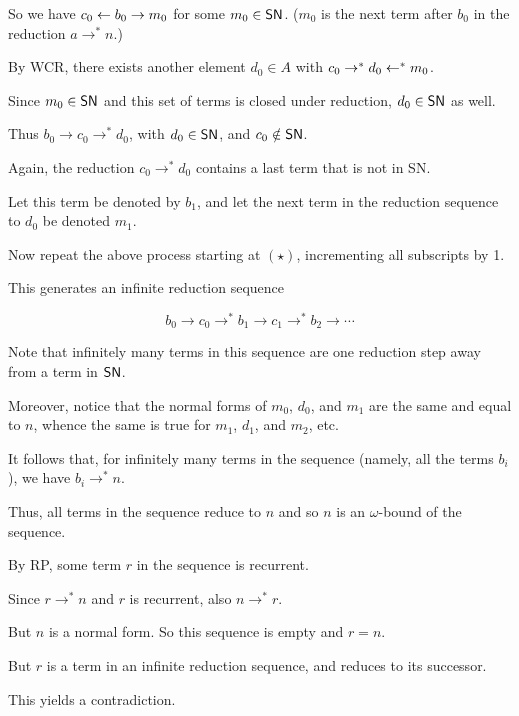 \documentclass{scrartcl}
\begin{document}
\begin{itemize}
  So we have $c_0 \leftarrow b_0 \to m_0$ for some $m_0 \in \mathsf{SN}$. ($m_0$ is the next term after $b_0$ in the reduction $a \to^* n$.)

  By WCR, there exists another element $d_0 \in A$ with $c_0 \to^* d_0 \leftarrow^* m_0$.

  Since $m_0 \in \mathsf{SN}$ and this set of terms is closed under reduction, $d_0 \in \mathsf{SN}$ as well.

  Thus $b_0 \to c_0 \to^* d_0$, with $d_0 \in \mathsf{SN}$, and $c_0 \notin \mathsf{SN}$.

  Again, the reduction $c_0 \to^* d_0$ contains a last term that is not in SN.

  Let this term be denoted by $b_1$, and let the next term in the reduction sequence
  to $d_0$ be denoted $m_1$.

  Now repeat the above process starting at $(\star)$, incrementing all subscripts by 1.

  This generates an infinite reduction sequence

  \[b_0 \to c_0 \to^* b_1 \to c_1 \to^* b_2 \to \cdots \]

  Note that infinitely many terms in this sequence are one reduction step
  away from a term in $\mathsf{SN}$.

  Moreover, notice that the normal forms of $m_0$, $d_0$, and $m_1$ are the same
  and equal to $n$, whence the same is true for $m_1$, $d_1$, and $m_2$, etc.

  It follows that, for infinitely many terms in the sequence
  (namely, all the terms $b_i$), we have $b_i \to^* n$.

  Thus, all terms in the sequence reduce to $n$ and so $n$ is an $\omega$-bound
  of the sequence.

  By RP, some term $r$ in the sequence is recurrent.

  Since $r \to^* n$ and $r$ is recurrent, also $n \to^* r$.

  But $n$ is a normal form.  So this sequence is empty and $r=n$.

  But $r$ is a term in an infinite reduction sequence, and reduces to its successor.

  This yields a contradiction.
\end{itemize}
\end{document}
